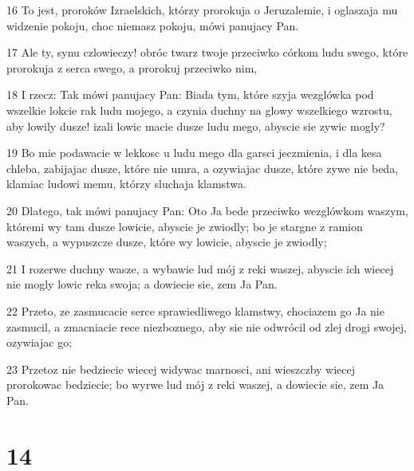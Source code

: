 \par 16 To jest, proroków Izraelskich, którzy prorokuja o Jeruzalemie, i oglaszaja mu widzenie pokoju, choc niemasz pokoju, mówi panujacy Pan.
\par 17 Ale ty, synu czlowieczy! obróc twarz twoje przeciwko córkom ludu swego, które prorokuja z serca swego, a prorokuj przeciwko nim,
\par 18 I rzecz: Tak mówi panujacy Pan: Biada tym, które szyja wezglówka pod wszelkie lokcie rak ludu mojego, a czynia duchny na glowy wszelkiego wzrostu, aby lowily dusze! izali lowic macie dusze ludu mego, abyscie sie zywic mogly?
\par 19 Bo mie podawacie w lekkosc u ludu mego dla garsci jeczmienia, i dla kesa chleba, zabijajac dusze, które nie umra, a ozywiajac dusze, które zywe nie beda, klamiac ludowi memu, którzy sluchaja klamstwa.
\par 20 Dlatego, tak mówi panujacy Pan: Oto Ja bede przeciwko wezglówkom waszym, któremi wy tam dusze lowicie, abyscie je zwiodly; bo je stargne z ramion waszych, a wypuszcze dusze, które wy lowicie, abyscie je zwiodly;
\par 21 I rozerwe duchny wasze, a wybawie lud mój z reki waszej, abyscie ich wiecej nie mogly lowic reka swoja; a dowiecie sie, zem Ja Pan.
\par 22 Przeto, ze zasmucacie serce sprawiedliwego klamstwy, chociazem go Ja nie zasmucil, a zmacniacie rece niezboznego, aby sie nie odwrócil od zlej drogi swojej, ozywiajac go;
\par 23 Przetoz nie bedziecie wiecej widywac marnosci, ani wieszczby wiecej prorokowac bedziecie; bo wyrwe lud mój z reki waszej, a dowiecie sie, zem Ja Pan.

\chapter{14}

